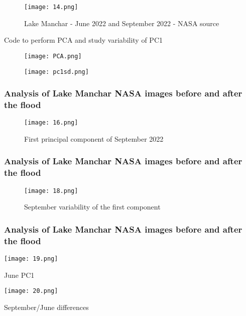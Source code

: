 \documentclass{beamer}
\begin{document}
\begin{frame}
    \begin{figure}
        \centering
        \texttt{[image: 14.png]}
        \label{fig:enter-label}
        \caption{Lake Manchar - June 2022 and September 2022 - NASA source}
    \end{figure}    
\end{frame}

\begin{frame}
\small\centering Code to perform PCA and study variability of PC1
        \begin{figure}
        \centering
        \texttt{[image: PCA.png]}
        \label{fig:enter-label}
    \end{figure}

    \begin{figure}
        \centering
        \texttt{[image: pc1sd.png]}
        \label{fig:enter-label}
    \end{figure}
\end{frame}

\begin{frame}
  \frametitle{\small Analysis of Lake Manchar NASA images before and after the flood} 

    \begin{figure}
        \centering
        \texttt{[image: 16.png]}
        \caption{First principal component of September 2022}
        \label{fig:enter-label}
    \end{figure}

\end{frame}

\begin{frame}
  \frametitle{\small Analysis of Lake Manchar NASA images before and after the flood} 

\begin{figure}
    \centering
    \texttt{[image: 18.png]}
    \label{fig:enter-label}
    \caption{September variability of the first component}
\end{figure}
  

\end{frame}

\begin{frame}
  \frametitle{\small Analysis of Lake Manchar NASA images before and after the flood} 

   \begin{minipage}{0.48\textwidth}
    \centering
    \texttt{[image: 19.png]}
    \caption{June PC1}
  \end{minipage}
  \hfill
  \begin{minipage}{0.48\textwidth}
    \centering
    \texttt{[image: 20.png]}
    \caption{September/June differences}
  \end{minipage}


\end{frame}
\end{document}
